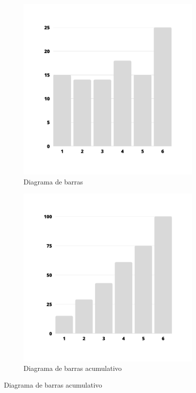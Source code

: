 \begin{figure}[h]
	\begin{subfigure}{0.5\textwidth}
		\centering
		\includegraphics[width=1\linewidth]{"Temas/Imagenes/Tema 1/Diagrama de barras 2"}
		\caption*{Diagrama de barras}
	\end{subfigure}
	\begin{subfigure}{0.5\textwidth}
		\centering
		\includegraphics[width=1\linewidth]{"Temas/Imagenes/Tema 1/Diagrama de barras acumulativo"}
		\caption*{Diagrama de barras acumulativo}
	\end{subfigure}
\end{figure}

